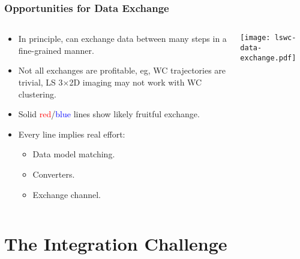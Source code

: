 \documentclass[xcolor=dvipsnames]{beamer}
\begin{document}
\begin{frame}
  \frametitle{Opportunities for Data Exchange}
  \begin{columns}
    \begin{column}{0.5\textwidth}
      \footnotesize
      \begin{itemize}
      \item In principle, can exchange data between many steps in a
        fine-grained manner.
      \item Not all exchanges are profitable, eg, WC trajectories are
        trivial, LS 3$\times$2D imaging may not work with WC clustering.
      \item Solid \textcolor{red}{red}/\textcolor{blue}{blue} lines show likely fruitful exchange.
      \item Every line implies real effort:
        \begin{itemize}\scriptsize
        \item Data model matching.
        \item Converters.
        \item Exchange channel.
        \end{itemize}
      \end{itemize}
    \end{column}
    \begin{column}{0.5\textwidth}
      \texttt{[image: lswc-data-exchange.pdf]}
    \end{column}
  \end{columns}
\end{frame}

\section{The Integration Challenge}

\begin{frame}
\end{frame}
\end{document}

